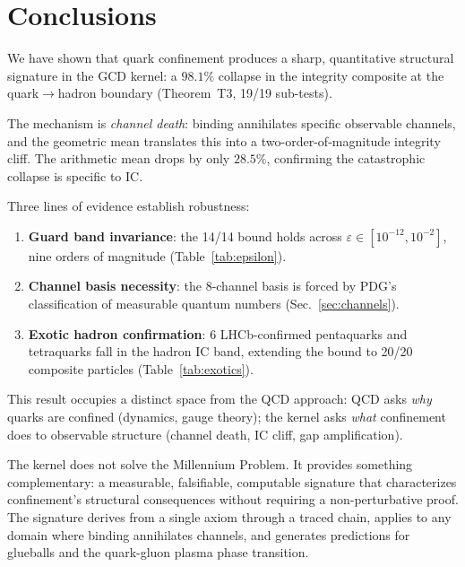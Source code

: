 \documentclass[11pt,a4paper]{article}
\theoremstyle{plain}
\theoremstyle{definition}
\theoremstyle{remark}
\newcommand{\eps}{\varepsilon}
\begin{document}
\section{Conclusions}\label{sec:conclusions}

We have shown that quark confinement produces a sharp,
quantitative structural signature in the GCD kernel: a $98.1\%$
collapse in the integrity composite at the quark$\to$hadron
boundary (Theorem~T3, 19/19 sub-tests).

The mechanism is \emph{channel death}: binding annihilates
specific observable channels, and the geometric mean translates
this into a two-order-of-magnitude integrity cliff.  The
arithmetic mean drops by only $28.5\%$, confirming the
catastrophic collapse is specific to IC.

Three lines of evidence establish robustness:
\begin{enumerate}
\item \textbf{Guard band invariance}: the 14/14 bound holds
  across $\eps \in [10^{-12}, 10^{-2}]$, nine orders of
  magnitude (Table~\ref{tab:epsilon}).
\item \textbf{Channel basis necessity}: the 8-channel basis is
  forced by PDG's classification of measurable quantum numbers
  (Sec.~\ref{sec:channels}).
\item \textbf{Exotic hadron confirmation}: 6 LHCb-confirmed
  pentaquarks and tetraquarks fall in the hadron IC band,
  extending the bound to 20/20 composite particles
  (Table~\ref{tab:exotics}).
\end{enumerate}

This result occupies a distinct space from the QCD approach:
QCD asks \emph{why} quarks are confined (dynamics, gauge theory);
the kernel asks \emph{what} confinement does to observable
structure (channel death, IC cliff, gap amplification).

The kernel does not solve the Millennium Problem.  It provides
something complementary: a measurable, falsifiable, computable
signature that characterizes confinement's structural consequences
without requiring a non-perturbative proof.  The signature derives
from a single axiom through a traced chain, applies to any domain
where binding annihilates channels, and generates predictions for
glueballs and the quark-gluon plasma phase transition.

\vspace{8pt}
\end{document}
